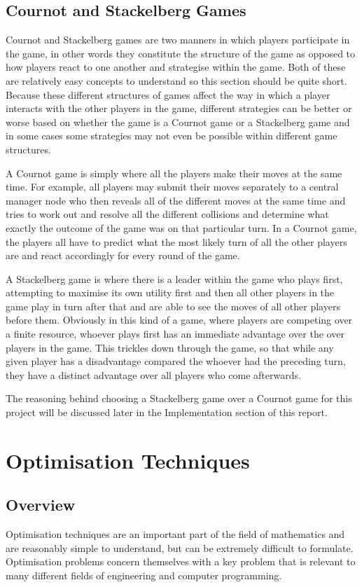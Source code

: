 \documentclass[a4paper, notitlepage]{report}
\begin{document}
\section{Cournot and Stackelberg Games}
\label{sec:org1c8e188}
Cournot and Stackelberg games are two manners in which players participate in
the game, in other words they constitute the structure of the game as opposed to
how players react to one another and strategise within the game. Both of these
are relatively easy concepts to understand so this section should be quite
short. Because these different structures of games affect the way in which a
player interacts with the other players in the game, different strategies can be
better or worse based on whether the game is a Cournot game or a Stackelberg
game and in some cases some strategies may not even be possible within different
game structures.

A Cournot game is simply where all the players make their moves at the same
time. For example, all players may submit their moves separately to a central
manager node who then reveals all of the different moves at the same time and
tries to work out and resolve all the different collisions and determine what
exactly the outcome of the game was on that particular turn. In a Cournot game,
the players all have to predict what the most likely turn of all the other
players are and react accordingly for every round of the game.

A Stackelberg game is where there is a leader within the game who plays first,
attempting to maximise its own utility first and then all other players in the
game play in turn after that and are able to see the moves of all other players
before them. Obviously in this kind of a game, where players are competing over
a finite resource, whoever plays first has an immediate advantage over the over
players in the game. This trickles down through the game, so that while any
given player has a disadvantage compared the whoever had the preceding turn,
they have a distinct advantage over all players who come afterwards.

The reasoning behind choosing a Stackelberg game over a Cournot game for this
project will be discussed later in the Implementation section of this report.
\chapter{Optimisation Techniques}
\label{sec:org4fdec81}
\section{Overview}
\label{sec:org98fcd2e}
Optimisation techniques are an important part of the field of mathematics and
are reasonably simple to understand, but can be extremely difficult to
formulate. Optimisation problems concern themselves with a key problem that is
relevant to many different fields of engineering and computer programming.
\end{document}
